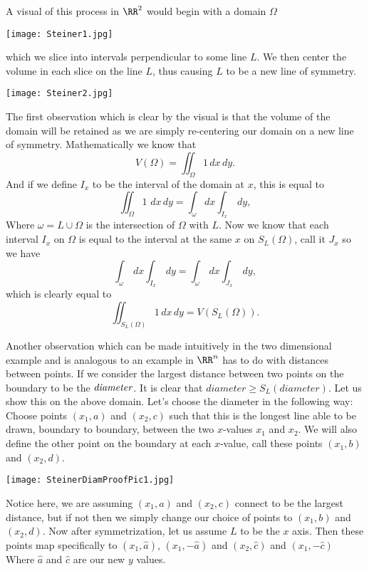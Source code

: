 \documentclass[12pt]{report}
\numberwithin{definition}{section}
\begin{document}
 A visual of this process in $\RR^2$ would begin with a domain $\Omega$ 

  

 	\texttt{[image: Steiner1.jpg]}
 	
 	  
 	
 	which we slice into intervals perpendicular to some line $L$. We then center the volume in each slice on the line $L$, thus causing $L$ to be a new line of symmetry. 
 	
 	  
 	
 		\texttt{[image: Steiner2.jpg]}
 		
 		  
 		
 	The first observation which is clear by the visual is that the volume of the domain will be retained as we are simply re-centering our domain on a new line of symmetry. Mathematically we know that 
 	\[
 	V(\Omega) = \iint_{\Omega} 1     \,dx   \,dy .
 	\] 
 	And if we define $I_x$ to be the interval of the domain at $x$, this is equal to 
 	\[
 \iint_\Omega 1   \,  \,dx   \,dy  = \int _{\omega}  dx\int_{I_x}    \,dy ,
 	\] 
 	Where $\omega= L \cup \Omega$ is the intersection of $\Omega$ with $L$. Now we know that each interval $I_x$ on $\Omega$ is equal to the interval at the same $x$ on  $S_L(\Omega)$, call it $J_x$ so we have
    \[
 	\int _{\omega}  \,dx\int_{I_x}    \,dy =\int _{\omega}  \,dx\int_{J_x}    \,dy ,
 	\] 
 	which is clearly equal to 
 	\[
 	\iint_{S_L(\Omega)} 1   \,dx   \,dy = V(S_L(\Omega)) .
 	\]
 	
 	    Another observation which can be made intuitively in the two dimensional example and is analogous to an example in $\RR^n$ has to do with distances between points. If we consider the largest distance between two  points on the boundary to be the $\it diameter$. It is clear that $diameter\geq S_L(diameter)$.
 	Let us show this on the above domain. Let's choose the diameter in the following way: Choose points $(x_1, a)$ and $(x_2, c)$ such that this is the longest line able to be drawn, boundary to boundary, between the two $x$-values $x_1$ and $x_2$. We will also define the other point on the boundary at each $x$-value, call these points $(x_1, b)$ and $(x_2, d)$. 
 	
 	  
 	
 	 		\texttt{[image: SteinerDiamProofPic1.jpg]}
 	 		
 	 		
 	  
 	
 	Notice here, we are assuming $(x_1, a)$ and $(x_2, c)$ connect to be the largest distance, but if not then we simply change our choice of points to $(x_1, b)$ and $(x_2, d)$. Now after symmetrization, let us assume $L$ to be the $x$ axis. Then these points map specifically to $(x_1, \hat{a})$, $(x_1, -\hat{a})$ and $(x_2, \hat{c})$ and $(x_1, -\hat{c})$ Where $\hat{a}$ and $\hat{c}$ are our new $y$ values. 
 	
\end{document}
